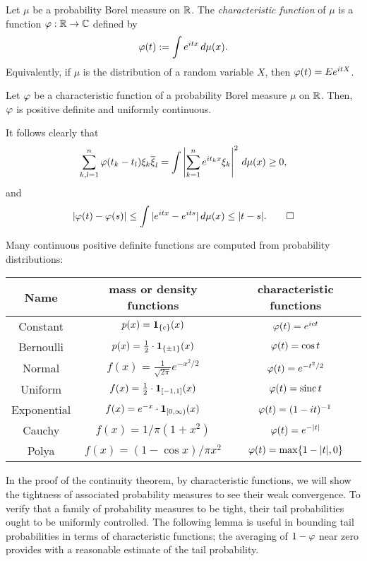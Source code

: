 \documentclass[10pt]{article}
\begin{document}
\begin{defn}
Let $\mu$ be a probability Borel measure on $\mathbb{R}$.
The \emph{characteristic function} of $\mu$ is a function $\varphi:\mathbb{R}\to\mathbb{C}$ defined by
\[\varphi(t):=\int e^{itx}\,d\mu(x).\]
Equivalently, if $\mu$ is the distribution of a random variable $X$, then $\varphi(t)=Ee^{itX}$.
\end{defn}

\begin{prop}
Let $\varphi$ be a characteristic function of a probability Borel measure $\mu$ on $\mathbb{R}$.
Then, $\varphi$ is positive definite and uniformly continuous.
\end{prop}
\begin{pf}
It follows clearly that
\[\sum_{k,l=1}^n\varphi(t_k-t_l)\xi_k\overline\xi_l=\int\left|\sum_{k=1}^ne^{it_kx}\xi_k\right|^2\,d\mu(x)\ge0,\]
and
\[|\varphi(t)-\varphi(s)|\le\int|e^{itx}-e^{its}|\,d\mu(x)\le|t-s|.\qedhere\]
\end{pf}
\begin{ex}
Many continuous positive definite functions are computed from probability distributions:
\begin{center}\renewcommand{\arraystretch}{1.8}
\begin{tabular}{ccc}
Name & mass or density functions & characteristic functions\\
\hline
Constant & $p(x)=\mathbf{1}_{\{c\}}(x)$ & $\varphi(t)=e^{ict}$\\
Bernoulli & $p(x)=\frac12\cdot\mathbf{1}_{\{\pm1\}}(x)$ & $\varphi(t)=\cos t$\\
Normal & $f(x)=\frac1{\sqrt{2\pi}}e^{-x^2/2}$ & $\varphi(t)=e^{-t^2/2}$\\
Uniform & $f(x)=\frac12\cdot\mathbf{1}_{[-1,1]}(x)$ & $\varphi(t)=\operatorname{sinc}t$\\
Exponential & $f(x)=e^{-x}\cdot\mathbf{1}_{[0,\infty)}(x)$ & $\varphi(t)=(1-it)^{-1}$\\
Cauchy & $f(x)=1/\pi(1+x^2)$ & $\varphi(t)=e^{-|t|}$\\
Polya & $f(x)=(1-\cos x)/\pi x^2$ & $\varphi(t)=\max\{1-|t|,0\}$
\end{tabular}
\end{center}
\end{ex}



In the proof of the continuity theorem, by characteristic functions, we will show the tightness of associated probability measures to see their weak convergence.
To verify that a family of probability measures to be tight, their tail probabilities ought to be uniformly controlled.
The following lemma is useful in bounding tail probabilities in terms of characteristic functions; the averaging of $1-\varphi$ near zero provides with a reasonable estimate of the tail probability.
\end{document}
